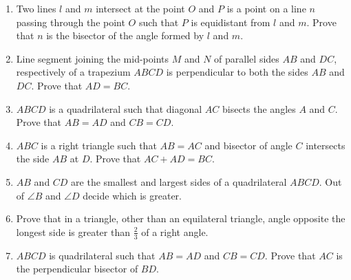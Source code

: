 \documentclass {article}
\begin{document}
\begin {enumerate}
\item Two lines $l$ and $m$ intersect at the point $O$ and $P$ is a point on a line $n$ passing through the point $O$ such that $P$ is equidistant from $l$ and $m$. Prove that $n$ is the bisector of the angle formed by $l$ and $m$.
\item Line segment joining the mid-points $M$ and $N$ of parallel sides $AB$ and $DC$, respectively of a trapezium $ABCD$ is perpendicular to both the sides $AB$ and $DC$. Prove that $AD = BC$.
\item $ABCD$ is a quadrilateral such that diagonal $AC$ bisects the angles $A$ and $C$. Prove that $AB = AD$ and $CB = CD$.
\item $ABC$ is a right triangle such that $AB = AC$ and bisector of angle $C$ intersects the side $AB$ at $D$. Prove that $AC + AD = BC$.
\item $AB$ and $CD$ are the smallest and largest sides of a quadrilateral $ABCD$. Out of $\angle B$ and $\angle D$ decide which is greater.
\item Prove that in a triangle, other than an equilateral triangle, angle opposite the longest side is greater than $\frac{2}{3}$ of a right angle.
\item $ABCD$ is quadrilateral such that $AB = AD$ and $CB = CD$. Prove that $AC$ is the perpendicular bisector of $BD$.
\end{enumerate}
\end{document}

